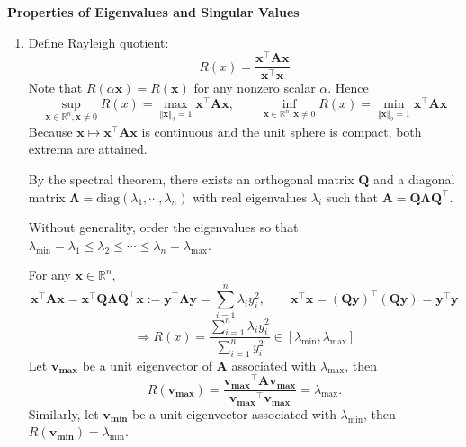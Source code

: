 \documentclass[11pt,letter,notitlepage]{article}
\theoremstyle{definition}
\begin{document}
\begin{solution}\textbf{Properties of Eigenvalues and Singular Values}
	\begin{enumerate}
		\item 
		Define Rayleigh quotient:
		\[
		R(x) = \frac{\mathbf{x}^\top\mathbf{A}\mathbf{x}}{\mathbf{x}^\top\mathbf{x}}
		\]
		Note that $R(\alpha \mathbf{x}) = R(\mathbf{x})$ for any nonzero scalar $\alpha$. Hence
		\[
		\sup_{\mathbf{x} \in \mathbb{R}^n, \mathbf{x} \neq 0} R(x) = \max_{\Vert \mathbf{x} \Vert_2 = 1} \mathbf{x^{\top}} \mathbf{A} \mathbf{x},
		\qquad
		\inf_{\mathbf{x} \in \mathbb{R}^n, \mathbf{x} \neq 0} R(x) = \min_{\Vert \mathbf{x} \Vert_2 = 1} \mathbf{x^{\top}} \mathbf{A} \mathbf{x}
		\]
		Because $\mathbf{x} \mapsto \mathbf{x}^{\top} \mathbf{A} \mathbf{x}$ is continuous and the unit sphere is compact, both extrema are attained.

		By the spectral theorem, there exists an orthogonal matrix $\mathbf{Q}$ and a diagonal matrix $\mathbf{\Lambda} = \text{diag} (\lambda_1, \cdots, \lambda_n)$ with real eigenvalues $\lambda_i$ such that $\mathbf{A} = \mathbf{Q}\mathbf{\Lambda}\mathbf{Q}^{\top}$.

		Without generality, order the eigenvalues so that $\lambda_{\min} = \lambda_1 \leq \lambda_2 \leq \cdots \leq \lambda_n = \lambda_{\max}$.

		For any $\mathbf{x} \in \mathbb{R}^n$,
		\[
		\mathbf{x^{\top}} \mathbf{A} \mathbf{x}
		=
		\mathbf{x^{\top}} \mathbf{Q}\mathbf{\Lambda}\mathbf{Q}^{\top} \mathbf{x}
		:=
		\mathbf{y^{\top}} \mathbf{\Lambda} \mathbf{y}
		=
		\sum\limits_{i=1}^{n}\lambda_i y_i^2,
		\qquad
		\mathbf{x^{\top}}\mathbf{x}
		=
		(\mathbf{Q}\mathbf{y})^{\top}(\mathbf{Q}\mathbf{y})
		=
		\mathbf{y^{\top}}\mathbf{y}
		\]
		\[
		\Longrightarrow
		R(x)
		=
		\frac{\sum\limits_{i=1}^{n}\lambda_i y_i^2}{\sum\limits_{i=1}^{n}y_i^2}
		\in
		[\lambda_{\min}, \lambda_{\max}]
		\]
		Let $\mathbf{v_{\max}}$ be a unit eigenvector of $\mathbf{A}$ associated with $\lambda_{\max}$, then 
		$$
		R(\mathbf{v_{\max}}) = \frac{\mathbf{v_{\max}}^{\top} \mathbf{A} \mathbf{v_{\max}}}{\mathbf{v_{\max}}^{\top} \mathbf{v_{\max}}} = \lambda_{\max}.
		$$
		Similarly, let $\mathbf{v_{\min}}$ be a unit eigenvector associated with $\lambda_{\min}$, then $R(\mathbf{v_{\min}}) = \lambda_{\min}$.


\end{enumerate}
\end{solution}
\end{document}
